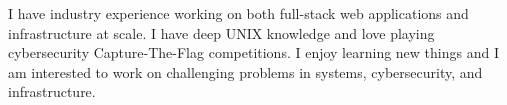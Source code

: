 

\begin{cvparagraph}

I have industry experience working on both full-stack web applications and infrastructure at scale. I have deep UNIX knowledge and love playing cybersecurity Capture-The-Flag competitions. I enjoy learning new things and I am interested to work on challenging problems in systems, cybersecurity, and infrastructure.
\end{cvparagraph}
